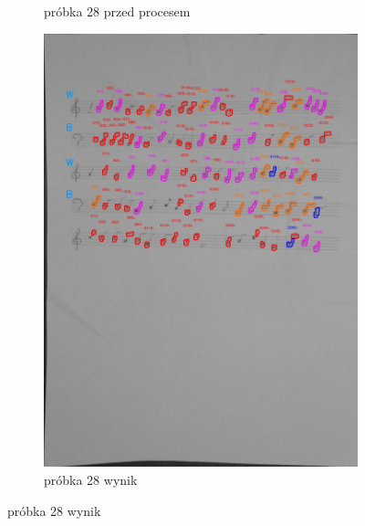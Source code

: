 \documentclass[11pt]{article}
\begin{document}
\begin{figure}
\begin{subfigure}[b]{0.475\textwidth}
        \caption[]%
        {{\small próbka 28 przed procesem}}
        \label{fig:sub3}
    \end{subfigure}
    \quad
    \begin{subfigure}[b]{0.475\textwidth}
        \centering
        \graphicspath{ {blobs/} }
        \includegraphics[width=\textwidth]{28_cnts.jpg}
        \caption[]%
        {{\small próbka 28 wynik}}
        \label{fig:sub 4}
    \end{subfigure}
    \label{fig 5}
\end{figure}

\FloatBarrier
\end{document}
